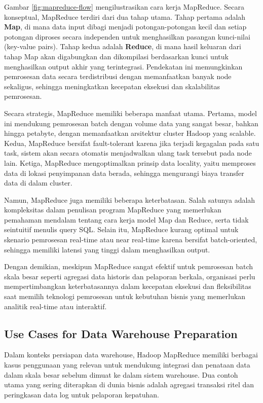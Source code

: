 Gambar \ref{fig:mapreduce-flow} mengilustrasikan cara kerja MapReduce. Secara konseptual, MapReduce terdiri dari dua tahap utama. Tahap pertama adalah \textbf{Map}, di mana data input dibagi menjadi potongan-potongan kecil dan setiap potongan diproses secara independen untuk menghasilkan pasangan kunci-nilai (key-value pairs). Tahap kedua adalah \textbf{Reduce}, di mana hasil keluaran dari tahap Map akan digabungkan dan dikompilasi berdasarkan kunci untuk menghasilkan output akhir yang terintegrasi. Pendekatan ini memungkinkan pemrosesan data secara terdistribusi dengan memanfaatkan banyak node sekaligus, sehingga meningkatkan kecepatan eksekusi dan skalabilitas pemrosesan. 

Secara strategis, MapReduce memiliki beberapa manfaat utama. Pertama, model ini mendukung pemrosesan batch dengan volume data yang sangat besar, bahkan hingga petabyte, dengan memanfaatkan arsitektur cluster Hadoop yang scalable. Kedua, MapReduce bersifat fault-tolerant karena jika terjadi kegagalan pada satu task, sistem akan secara otomatis menjadwalkan ulang task tersebut pada node lain. Ketiga, MapReduce mengoptimalkan prinsip data locality, yaitu memproses data di lokasi penyimpanan data berada, sehingga mengurangi biaya transfer data di dalam cluster.

Namun, MapReduce juga memiliki beberapa keterbatasan. Salah satunya adalah kompleksitas dalam penulisan program MapReduce yang memerlukan pemahaman mendalam tentang cara kerja model Map dan Reduce, serta tidak seintuitif menulis query SQL. Selain itu, MapReduce kurang optimal untuk skenario pemrosesan real-time atau near real-time karena bersifat batch-oriented, sehingga memiliki latensi yang tinggi dalam menghasilkan output.

Dengan demikian, meskipun MapReduce sangat efektif untuk pemrosesan batch skala besar seperti agregasi data historis dan pelaporan berkala, organisasi perlu mempertimbangkan keterbatasannya dalam kecepatan eksekusi dan fleksibilitas saat memilih teknologi pemrosesan untuk kebutuhan bisnis yang memerlukan analitik real-time atau interaktif.

\subsection{Use Cases for Data Warehouse Preparation}

Dalam konteks persiapan data warehouse, Hadoop MapReduce memiliki berbagai kasus penggunaan yang relevan untuk mendukung integrasi dan penataan data dalam skala besar sebelum dimuat ke dalam sistem warehouse. Dua contoh utama yang sering diterapkan di dunia bisnis adalah agregasi transaksi ritel dan peringkasan data log untuk pelaporan kepatuhan.


